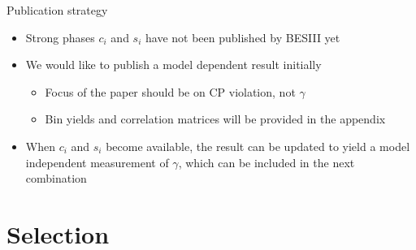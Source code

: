 \documentclass{beamer}
\begin{document}
\begin{frame}{Publication strategy}
  \begin{itemize}
    \setlength\itemsep{2.0em}
    \item{Strong phases $c_i$ and $s_i$ have not been published by BESIII yet}
    \item{We would like to publish a model dependent result initially}
    \begin{itemize}
      \item{Focus of the paper should be on CP violation, not $\gamma$}
      \item{Bin yields and correlation matrices will be provided in the appendix}
    \end{itemize}
    \item{When $c_i$ and $s_i$ become available, the result can be updated to yield a model independent measurement of $\gamma$, which can be included in the next combination}
  \end{itemize}
\end{frame}

\section{Selection}
\end{document}
